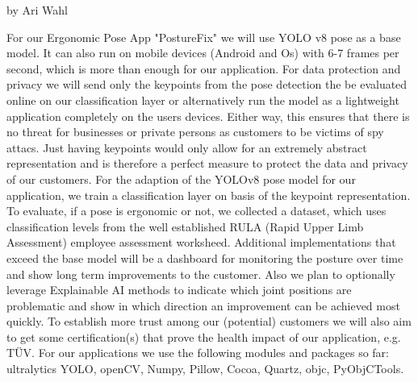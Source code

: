 
by Ari Wahl

For our Ergonomic Pose App "PostureFix" we will use YOLO v8 pose as a base model. It can also run on mobile devices (Android and Os) with 6-7 frames per second\cite{https://github.com/ultralytics/ultralytics/issues/4333}, which is more than enough for our application. For data protection and privacy we will send only the keypoints from the pose detection the be evaluated online on our classification layer or alternatively run the model as a lightweight application completely on the users devices. Either way, this ensures that there is no threat for businesses or private persons as customers to be victims of spy attacs. Just having keypoints would only allow for an extremely abstract representation and is therefore a perfect measure to protect the data and privacy of our customers. For the adaption of the YOLOv8 pose model for our application, we train a classification layer on basis of the keypoint representation. To evaluate, if a pose is ergonomic or not, we collected a dataset, which uses classification levels from the well established RULA (Rapid Upper Limb Assessment) employee assessment worksheed\cite{https://www.researchgate.net/publication/362455275_Home_office_versus_ergonomic_workstation_-_is_the_ergonomic_risk_increased_when_working_at_the_dining_table_An_inertial_motion_capture_based_pilot_study}. Additional implementations that exceed the base model will be a dashboard for monitoring the posture over time and show long term improvements to the customer. Also we plan to optionally leverage Explainable AI methods to indicate which joint positions are problematic and show in which direction an improvement can be achieved most quickly. To establish more trust among our (potential) customers we will also aim to get some certification(s) that prove the health impact of our application, e.g. TÜV. 
For our applications we use the following modules and packages so far: ultralytics YOLO, openCV, Numpy, Pillow, Cocoa, Quartz, objc, PyObjCTools. 


